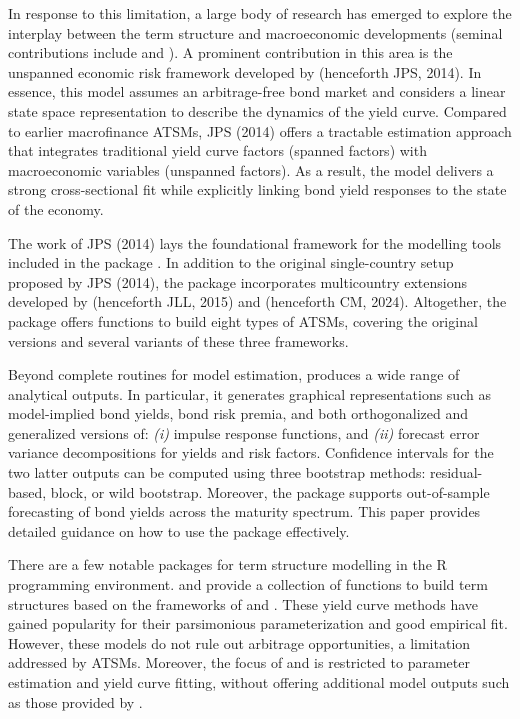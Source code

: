 In response to this limitation, a large body of research has emerged to explore the interplay between the term structure and macroeconomic developments (seminal contributions include \citet{AngPiazzesi2003} and \citet{RudebuschWu2008}). A prominent contribution in this area is the unspanned economic risk framework developed by \citet{JoslinPriebschSingleton2014} (henceforth JPS, 2014). In essence, this model assumes an arbitrage-free bond market and considers a linear state space representation to describe the dynamics of the yield curve. Compared to earlier macrofinance ATSMs, JPS (2014) offers a tractable estimation approach that integrates traditional yield curve factors (spanned factors) with macroeconomic variables (unspanned factors). As a result, the model delivers a strong cross-sectional fit while explicitly linking bond yield responses to the state of the economy.

The work of JPS (2014) lays the foundational framework for the modelling tools included in the  package \citep{MultiATSM2025}. In addition to the original single-country setup proposed by JPS (2014), the package incorporates multicountry extensions developed by \citet{JotikasthiraLeLundblad2015} (henceforth JLL, 2015) and \citet{CandelonMoura2024} (henceforth CM, 2024). Altogether, the package offers functions to build eight types of ATSMs, covering the original versions and several variants of these three frameworks.

Beyond complete routines for model estimation,  produces a wide range of analytical outputs. In particular, it generates graphical representations such as model-implied bond yields, bond risk premia, and both orthogonalized and generalized versions of: \emph{(i)} impulse response functions, and \emph{(ii)} forecast error variance decompositions for yields and risk factors. Confidence intervals for the two latter outputs can be computed using three bootstrap methods: residual-based, block, or wild bootstrap. Moreover, the package supports out-of-sample forecasting of bond yields across the maturity spectrum. This paper provides detailed guidance on how to use the  package effectively.

There are a few notable packages for term structure modelling in the R programming environment.  \citep{YieldCurve2015} and  \citep{fBonds2017} provide a collection of functions to build term structures based on the frameworks of \citet{NelsonSiegel1987} and \citet{Svensson1994}. These yield curve methods have gained popularity for their parsimonious parameterization and good empirical fit. However, these models do not rule out arbitrage opportunities, a limitation addressed by ATSMs. Moreover, the focus of  and  is restricted to parameter estimation and yield curve fitting, without offering additional model outputs such as those provided by .

